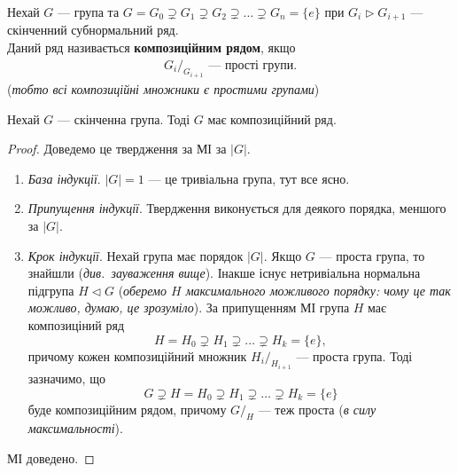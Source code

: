 \documentclass{math_library}
\begin{document}
\begin{definition}
Нехай $G$ --- група та $G = G_0 \supsetneq G_1 \supsetneq G_2 \supsetneq \dots \supsetneq G_n = \{e\}$ при $G_i \triangleright G_{i+1}$ --- скінченний субнормальний ряд.\\
Даний ряд називається \textbf{композиційним рядом}, якщо
\begin{align*}
G_i/_{G_{i+1}} \text{ --- прості групи.}
\end{align*}
(\textit{тобто всі композиційні множники є простими групами})
\end{definition}

\begin{proposition}
Нехай $G$ --- скінченна група. Тоді $G$ має композиційний ряд.
\end{proposition}

\begin{proof}
Доведемо це твердження за МІ за $|G|$.
\begin{enumerate}[nosep,wide=0pt,label={\Roman*.}]
\item \textit{База індукції}. $|G| = 1$ --- це тривіальна група, тут все ясно.

\item \textit{Припущення індукції}. Твердження виконується для деякого порядка, меншого за $|G|$.

\item \textit{Крок індукції}. Нехай група має порядок $|G|$. Якщо $G$ --- проста група, то знайшли (\textit{див.\ зауваження вище}). Інакше існує нетривіальна нормальна підгрупа $H \triangleleft G$ (\textit{оберемо $H$ максимального можливого порядку: чому це так можливо, думаю, це зрозуміло}). За припущенням МІ група $H$ має композиціний ряд
\[ 
H = H_0 \supsetneq H_1 \supsetneq \dots \supsetneq H_k = \{e\},
\] 
причому кожен композиційний множник ${H_i}/_{H_{i+1}}$ --- проста група. Тоді зазначимо, що 
\[
G \supsetneq H = H_0 \supsetneq  H_1 \supsetneq \dots \supsetneq H_k = \{e\}
\]
буде композиційним рядом, причому $G/_H$ --- теж проста (\textit{в силу максимальності}).
\end{enumerate}
МІ доведено.
\end{proof}
\end{document}
